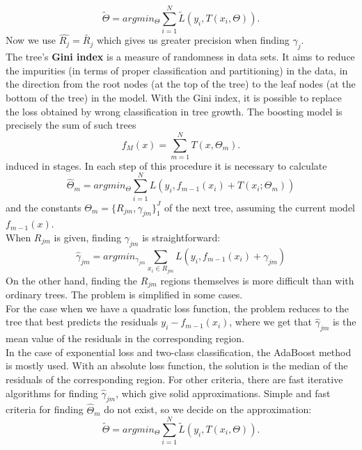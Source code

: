 \documentclass[12pt, letterpaper, twoside]{article}
\begin{document}
\begin{equation*}
\tilde{\Theta}=argmin_{\Theta}\sum_{i=1}^N \tilde{L}(y_i,T(x_i,\Theta)).
\end{equation*}
Now we use $\hat{R_j}=\tilde{R_j}$ which gives us greater precision when finding $\gamma_j$.\\
\hspace*{4ex}The tree's \textbf{Gini index} is a measure of randomness in data sets. It aims to reduce the impurities (in terms of proper classification and partitioning) in the data, in the direction from the root nodes (at the top of the tree) to the leaf nodes (at the bottom of the tree) in the model. With the Gini index, it is possible to replace the loss obtained by wrong classification in tree growth. The boosting model is precisely the sum of such trees 
\begin{equation*}
f_M(x)=\sum_{m=1}^N T(x,\Theta_m).
\end{equation*}
induced in stages. In each step of this procedure it is necessary to calculate
\begin{equation*}
\hat{\Theta}_m=argmin_{\Theta}\sum_{i=1}^N L(y_i,f_{m-1}(x_i)+T(x_i;\Theta_m))
\end{equation*}
and the constants $\Theta_m=\{R_{jm},\gamma_{jm}\}_1^J$ of the next tree, assuming the current model $f_{m-1}(x)$.\\
\hspace*{4ex}When $R_{jm}$ is given, finding $\gamma_{jm}$ is straightforward:
\begin{equation*}
\hat{\gamma}_{jm}=argmin_{\gamma_{jm}}\sum_{x_i \in R_{jm}} L(y_i,f_{m-1}(x_i)+\gamma_{jm})
\end{equation*}
On the other hand, finding the $R_{jm}$ regions themselves is more difficult than with ordinary trees. The problem is simplified in some cases.\\
\hspace*{4ex}For the case when we have a quadratic loss function, the problem reduces to the tree that best predicts the residuals $y_i − f_{m−1}(x_i)$, where we get that $\hat{\gamma}_{jm}$ is the mean value of the residuals in the corresponding region.\\
\hspace*{4ex}In the case of exponential loss and two-class classification, the AdaBoost method is mostly used. With an absolute loss function, the solution is the median of the residuals of the corresponding region. For other criteria, there are fast iterative algorithms for finding $\hat{\gamma}_{jm}$, which give solid approximations. Simple and fast criteria for finding $\hat{\Theta}_m$ do not exist, so we decide on the approximation:
\begin{equation*}
\tilde{\Theta}=argmin_{\Theta}\sum_{i=1}^N \tilde{L}(y_i,T(x_i,\Theta)).
\end{equation*}
\end{document}
